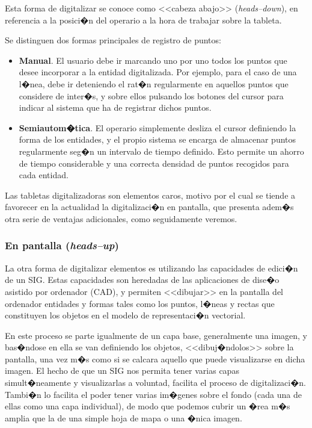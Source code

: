 Esta forma de digitalizar se conoce como <<cabeza abajo>> (\emph{heads--down}), en referencia a la posici�n del operario a la hora de trabajar sobre la tableta.

Se distinguen dos formas principales de registro de puntos:

\begin{itemize}
	\item \textbf{Manual}. El usuario debe ir marcando uno por uno todos los puntos que desee incorporar a la entidad digitalizada. Por ejemplo, para el caso de una l�nea, debe ir deteniendo el rat�n regularmente en aquellos puntos que considere de inter�s, y sobre ellos pulsando los botones del cursor para indicar al sistema que ha de registrar dichos puntos.
	\item \textbf{Semiautom�tica}. El operario simplemente desliza el cursor definiendo la forma de los entidades, y el propio sistema se encarga de almacenar puntos regularmente seg�n un intervalo de tiempo definido. Esto permite un ahorro de tiempo considerable y una correcta densidad de puntos recogidos para cada entidad.	
\end{itemize}

Las tabletas digitalizadoras son elementos caros, motivo por el cual se tiende a favorecer en la actualidad la digitalizaci�n en pantalla, que presenta adem�s otra serie de ventajas adicionales, como seguidamente veremos.
 
\subsubsection{En pantalla (\emph{heads--up})}


La otra forma de digitalizar elementos es utilizando las capacidades de edici�n de un SIG. Estas capacidades son heredadas de las aplicaciones de dise�o asistido por ordenador (CAD), y permiten <<dibujar>> en la pantalla del ordenador entidades y formas tales como los puntos, l�neas y rectas que constituyen los objetos en el modelo de representaci�n vectorial.

En este proceso se parte igualmente de un capa base, generalmente una imagen, y bas�ndose en ella se van definiendo los objetos, <<dibuj�ndolos>> sobre la pantalla, una vez m�s como si se calcara aquello que puede visualizarse en dicha imagen. El hecho de que un SIG nos permita tener varias capas simult�neamente y visualizarlas a voluntad, facilita el proceso de digitalizaci�n. Tambi�n lo facilita el poder tener varias im�genes sobre el fondo (cada una de ellas como una capa individual), de modo que podemos cubrir un �rea m�s amplia que la de una simple hoja de mapa o una �nica imagen.

